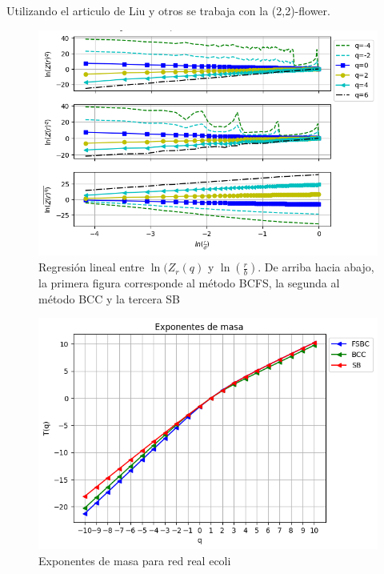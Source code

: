 Utilizando el articulo de Liu y otros\cite{Liu2015} se trabaja con la (2,2)-flower.

\begin{figure}[H]
    \centering
    \includegraphics[scale=0.7]{Capitulo4Multifractalidad/imagenes/a_TqLnrBCflower22.png}
    \caption{Regresión lineal entre $\ln(Z_r(q)$ y $\ln(\frac{r}{b})$. De arriba hacia abajo, la primera figura corresponde al método BCFS, la segunda al método BCC y la tercera SB}
\end{figure}

\begin{figure}[H]
    \centering
    \includegraphics[scale=0.7]{Capitulo4Multifractalidad/imagenes/a_Tqflower22.png}
    \caption{Exponentes de masa para red real ecoli}
\end{figure}


